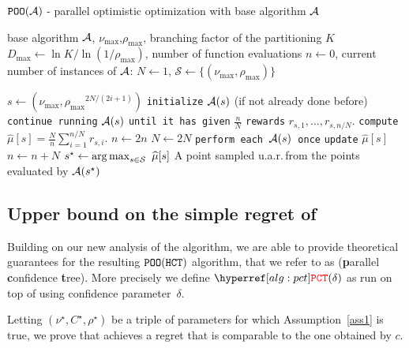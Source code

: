 \begin{algorithm}[ht]
\centering
\caption{$\texttt{POO}(\mathcal{A})$ - parallel optimistic optimization with base algorithm $\mathcal{A}$}
\label{alg:pct}
\begin{algorithmic}[1]
     base algorithm $\mathcal{A}$, $\nu_{\max}$,$\rho_{\max}$, branching factor of the partitioning $K$
     $D_{\max} \gets \ln K/\ln\left( 1/\rho_{\max}\right)$, number of function evaluations $n \gets 0$, current number of instances of $\mathcal{A}$: $N \gets 1$, $\mathcal{S} \gets \{(\nu_{\max},\rho_{\max})\}$
    
        		\State $s \gets \left(\nu_{\max},{\rho_{\max}}^{2N/(2i+1)}\right)$
        		\State \texttt{initialize} $\mathcal{A}(s)$ (if not already done before) 
        		\State \texttt{continue running} $\mathcal{A}(s)$ \texttt{until it has given} $\frac{n}{N}$ \texttt{rewards} $r_{s,1},\ldots,r_{s,n/N}$.
        		\State \texttt{compute} $\widehat{\mu}[s] = \frac{N}{n}\sum_{i=1}^{n/N}r_{s,i}.$
        	\EndFor
            \State $n \gets 2n$
            \State $N \gets 2N$
        \EndWhile
        \State \texttt{perform each $\mathcal{A}(s)$ once} 
        \State \texttt{update} $\widehat{\mu}[s]$
        \State $n \gets n+N$
    \EndWhile
    \State $s^\star \gets \operatorname*{arg\,max}_{s\in\mathcal{S}}~\widehat{\mu}[s]$
     A point sampled u.a.r.\,from the points evaluated by $\mathcal{A}(s^\star)$
\end{algorithmic}
\end{algorithm}

\subsection{Upper bound on the simple regret of \PCT{}}

Building on our new analysis of the \HCT algorithm, we are able to provide theoretical guarantees for the resulting $\texttt{POO}(\texttt{HCT})$ algorithm, that we refer to as \PCT (\textbf{p}arallel \textbf{c}onfidence \textbf{t}ree). More precisely we define $\PCT(\delta)$ as \POO run on top of \HCT using confidence parameter~$\delta$.

Letting $(\nu^\star,C^\star,\rho^\star)$ be a triple of parameters for which Assumption~\ref{ass1} is true, we prove that \PCT achieves a regret that is comparable to the one obtained by $c$.


